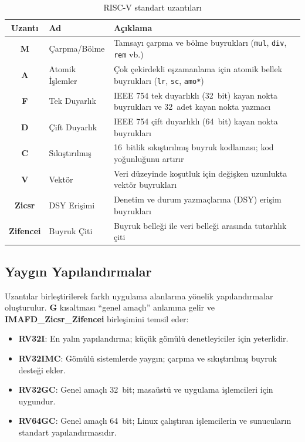 \begin{table}[H]
\centering
\caption{RISC-V standart uzantıları}\label{tab:ekc-uzantilar}
\begin{tabular}{@{}clp{8cm}@{}}
\toprule
\textbf{Uzantı} & \textbf{Ad} & \textbf{Açıklama} \\
\midrule
\textbf{M} & Çarpma/Bölme & Tamsayı çarpma ve bölme buyrukları (\texttt{mul}, \texttt{div}, \texttt{rem} vb.) \\
\textbf{A} & Atomik İşlemler & Çok çekirdekli eşzamanlama için atomik bellek buyrukları (\texttt{lr}, \texttt{sc}, \texttt{amo*}) \\
\textbf{F} & Tek Duyarlık & IEEE 754 tek duyarlıklı (32~bit) kayan nokta buyrukları ve 32~adet kayan nokta yazmacı \\
\textbf{D} & Çift Duyarlık & IEEE 754 çift duyarlıklı (64~bit) kayan nokta buyrukları \\
\textbf{C} & Sıkıştırılmış & 16~bitlik sıkıştırılmış buyruk kodlaması; kod yoğunluğunu artırır \\
\textbf{V} & Vektör & Veri düzeyinde koşutluk için değişken uzunlukta vektör buyrukları \\
\textbf{Zicsr} & DSY Erişimi & Denetim ve durum yazmaçlarına (DSY) erişim buyrukları \\
\textbf{Zifencei} & Buyruk Çiti & Buyruk belleği ile veri belleği arasında tutarlılık çiti \\
\bottomrule
\end{tabular}
\end{table}

\subsection{Yaygın Yapılandırmalar}

Uzantılar birleştirilerek farklı uygulama alanlarına yönelik yapılandırmalar oluşturulur. \textbf{G} kısaltması ``genel amaçlı'' anlamına gelir ve \mbox{\textbf{IMAFD\_Zicsr\_Zifencei}} birleşimini temsil eder:

\begin{itemize}
    \item \textbf{RV32I}: En yalın yapılandırma; küçük gömülü denetleyiciler için yeterlidir.
    \item \textbf{RV32IMC}: Gömülü sistemlerde yaygın; çarpma ve sıkıştırılmış buyruk desteği ekler.
    \item \textbf{RV32GC}: Genel amaçlı 32~bit; masaüstü ve uygulama işlemcileri için uygundur.
    \item \textbf{RV64GC}: Genel amaçlı 64~bit; Linux çalıştıran işlemcilerin ve sunucuların standart yapılandırmasıdır.
\end{itemize}

